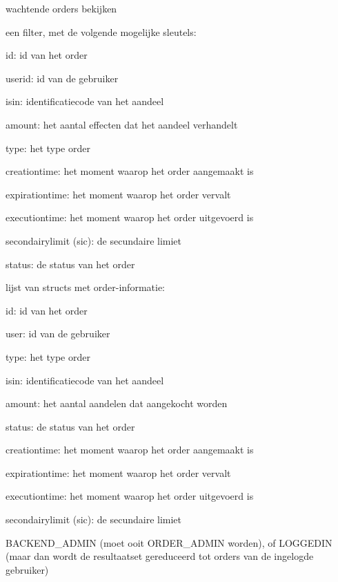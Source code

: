 	{ wachtende orders bekijken }
	{ een filter, met de volgende mogelijke sleutels:
		\begin{itemize_compact}
		\item{id: id van het order}
		\item{userid: id van de gebruiker}
		\item{isin: identificatiecode van het aandeel}
		\item{amount: het aantal effecten dat het aandeel verhandelt}
		\item{type: het type order}
		\item{creationtime: het moment waarop het order aangemaakt is}
		\item{expirationtime: het moment waarop het order vervalt}
		\item{executiontime: het moment waarop het order uitgevoerd is}
		\item{secondairylimit (sic): de secundaire limiet}
		\item{status: de status van het order}
		\end{itemize_compact} }
	{ lijst van structs met order-informatie:
		\begin{itemize_compact}
		\item{id: id van het order}
		\item{user: id van de gebruiker}
		\item{type: het type order}
		\item{isin: identificatiecode van het aandeel}
		\item{amount: het aantal aandelen dat aangekocht worden}
		\item{status: de status van het order}
		\item{creationtime: het moment waarop het order aangemaakt is}
		\item{expirationtime: het moment waarop het order vervalt}
		\item{executiontime: het moment waarop het order uitgevoerd is}
		\item{secondairylimit (sic): de secundaire limiet}
		\end{itemize_compact} }
	{ BACKEND\_ADMIN (moet ooit ORDER\_ADMIN worden), of LOGGEDIN (maar dan wordt de resultaatset gereduceerd tot orders van de ingelogde gebruiker) }

